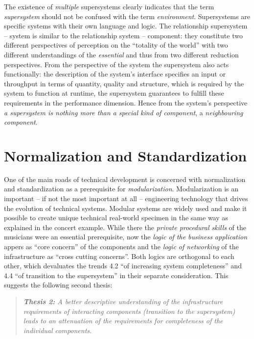 \documentclass[11pt,a4paper]{article}
\begin{document}
The existence of \emph{multiple} supersystems clearly indicates that the term
\emph{supersystem} should not be confused with the term \emph{environment}.
Supersystems are specific systems with their own language and logic. The
relationship supersystem -- system is similar to the relationship system --
component: they constitute two different perspectives of perception on the
``totality of the world'' with two different understandings of the
\emph{essential} and thus from two different reduction perspectives.  From the
perspective of the system the supersystem also acts functionally: the
description of the system's interface specifies an input or throughput in
terms of quantity, quality and structure, which is required by the system to
function at runtime, the supersystem guarantees to fulfill these requirements
in the performance dimension.  Hence from the system's perspective \emph{a
  supersystem is nothing more than a special kind of component}, a
\emph{neighbouring component}.

\section{Normalization and Standardization}

One of the main roads of technical development is concerned with normalization
and standardization as a prerequisite for \emph{modularization}.
Modularization is an important -- if not the most important at all --
engineering technology that drives the evolution of technical systems.
Modular systems are widely used and make it possible to create unique
technical real-world specimen in the same way as explained in the concert
example. While there the \emph{private procedural skills} of the musicians
were an essential prerequisite, now the \emph{logic of the business
  application} appers as ``core concern'' of the components and the
\emph{logic of networking} of the infrastructure as ``cross cutting
concerns''. Both logics are orthogonal to each other, which devaluates the
trends 4.2 ``of increasing system completeness'' and 4.4 ``of transition to
the supersystem'' in their separate consideration.  This suggests the
following second thesis:
\begin{quote}\it 
  \textbf{Thesis 2:} A better descriptive understanding of the infrastructure
  requirements of interacting components (transition to the supersystem) leads
  to an \emph{attenuation} of the requirements for completeness of the
  individual components.
\end{quote}
\end{document}
